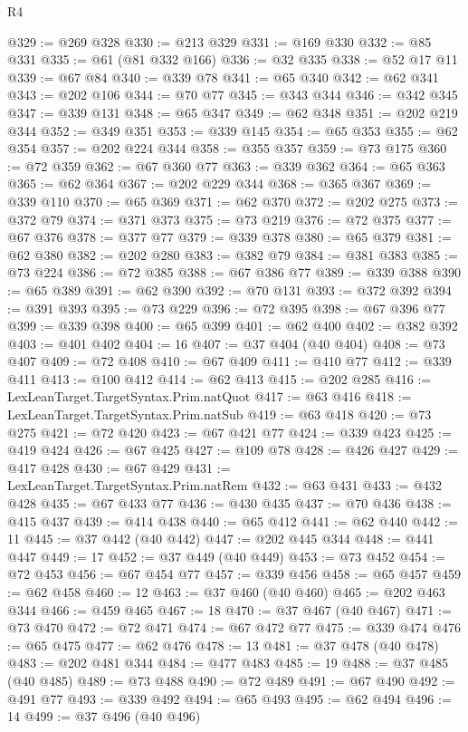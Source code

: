 \begin{lexlean}{R4}
\begin{coremodule}
@329 := @269 @328
@330 := @213 @329
@331 := @169 @330
@332 := @85 @331
@335 := @61 (@81 @332 @166)
@336 := @32 @335
@338 := @52 @17 @11
@339 := @67 @84
@340 := @339 @78
@341 := @65 @340
@342 := @62 @341
@343 := @202 @106
@344 := @70 @77
@345 := @343 @344
@346 := @342 @345
@347 := @339 @131
@348 := @65 @347
@349 := @62 @348
@351 := @202 @219 @344
@352 := @349 @351
@353 := @339 @145
@354 := @65 @353
@355 := @62 @354
@357 := @202 @224 @344
@358 := @355 @357
@359 := @73 @175
@360 := @72 @359
@362 := @67 @360 @77
@363 := @339 @362
@364 := @65 @363
@365 := @62 @364
@367 := @202 @229 @344
@368 := @365 @367
@369 := @339 @110
@370 := @65 @369
@371 := @62 @370
@372 := @202 @275
@373 := @372 @79
@374 := @371 @373
@375 := @73 @219
@376 := @72 @375
@377 := @67 @376
@378 := @377 @77
@379 := @339 @378
@380 := @65 @379
@381 := @62 @380
@382 := @202 @280
@383 := @382 @79
@384 := @381 @383
@385 := @73 @224
@386 := @72 @385
@388 := @67 @386 @77
@389 := @339 @388
@390 := @65 @389
@391 := @62 @390
@392 := @70 @131
@393 := @372 @392
@394 := @391 @393
@395 := @73 @229
@396 := @72 @395
@398 := @67 @396 @77
@399 := @339 @398
@400 := @65 @399
@401 := @62 @400
@402 := @382 @392
@403 := @401 @402
@404 := 16
@407 := @37 @404 (@40 @404)
@408 := @73 @407
@409 := @72 @408
@410 := @67 @409
@411 := @410 @77
@412 := @339 @411
@413 := @100 @412
@414 := @62 @413
@415 := @202 @285
@416 := LexLeanTarget.TargetSyntax.Prim.natQuot
@417 := @63 @416
@418 := LexLeanTarget.TargetSyntax.Prim.natSub
@419 := @63 @418
@420 := @73 @275
@421 := @72 @420
@423 := @67 @421 @77
@424 := @339 @423
@425 := @419 @424
@426 := @67 @425
@427 := @109 @78
@428 := @426 @427
@429 := @417 @428
@430 := @67 @429
@431 := LexLeanTarget.TargetSyntax.Prim.natRem
@432 := @63 @431
@433 := @432 @428
@435 := @67 @433 @77
@436 := @430 @435
@437 := @70 @436
@438 := @415 @437
@439 := @414 @438
@440 := @65 @412
@441 := @62 @440
@442 := 11
@445 := @37 @442 (@40 @442)
@447 := @202 @445 @344
@448 := @441 @447
@449 := 17
@452 := @37 @449 (@40 @449)
@453 := @73 @452
@454 := @72 @453
@456 := @67 @454 @77
@457 := @339 @456
@458 := @65 @457
@459 := @62 @458
@460 := 12
@463 := @37 @460 (@40 @460)
@465 := @202 @463 @344
@466 := @459 @465
@467 := 18
@470 := @37 @467 (@40 @467)
@471 := @73 @470
@472 := @72 @471
@474 := @67 @472 @77
@475 := @339 @474
@476 := @65 @475
@477 := @62 @476
@478 := 13
@481 := @37 @478 (@40 @478)
@483 := @202 @481 @344
@484 := @477 @483
@485 := 19
@488 := @37 @485 (@40 @485)
@489 := @73 @488
@490 := @72 @489
@491 := @67 @490
@492 := @491 @77
@493 := @339 @492
@494 := @65 @493
@495 := @62 @494
@496 := 14
@499 := @37 @496 (@40 @496)

\end{coremodule}
\end{lexlean}
